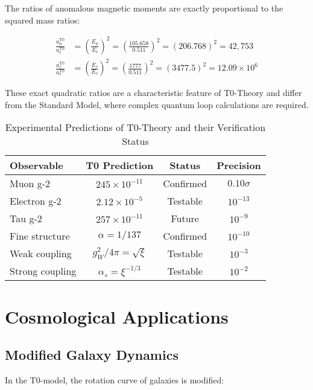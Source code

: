 \documentclass[12pt,a4paper]{article}
\newcommand{\ee}{\text{$\mathrm{e}$}}
\newcommand{\mmu}{\text{$\mu$}}
\newcommand{\ttau}{\text{$\tau$}}
\theoremstyle{definition}
\begin{document}
	\begin{verhaltnis}
		The ratios of anomalous magnetic moments are exactly proportional to the squared mass ratios:
		
		\begin{align}
			\frac{a_{\mmu}^{\text{T0}}}{a_{\ee}^{\text{T0}}} &= \left(\frac{E_{\mmu}}{E_{\ee}}\right)^2 = \left(\frac{105.658}{0.511}\right)^2 = (206.768)^2 = 42{,}753\\
			\frac{a_{\ttau}^{\text{T0}}}{a_{\ee}^{\text{T0}}} &= \left(\frac{E_{\ttau}}{E_{\ee}}\right)^2 = \left(\frac{1777}{0.511}\right)^2 = (3477.5)^2 = 12.09 \times 10^6
		\end{align}
		
		These exact quadratic ratios are a characteristic feature of T0-Theory and differ from the Standard Model, where complex quantum loop calculations are required.
	\end{verhaltnis}
	\begin{table}[h]
		\centering
		\begin{tabular}{lccc}
			\toprule
			\textbf{Observable} & \textbf{T0 Prediction} & \textbf{Status} & \textbf{Precision} \\
			\midrule
			Muon g-2 & $245 \times 10^{-11}$ & Confirmed & $0.10\sigma$ \\
			Electron g-2 & $2.12 \times 10^{-5}$ & Testable & $10^{-13}$ \\
			Tau g-2 & $257 \times 10^{-11}$ & Future & $10^{-9}$ \\
			Fine structure & $\alpha = 1/137$ & Confirmed & $10^{-10}$ \\
			Weak coupling & $g_W^2/4\pi = \sqrt{\xi}$ & Testable & $10^{-3}$ \\
			Strong coupling & $\alpha_s = \xi^{-1/3}$ & Testable & $10^{-2}$ \\
			\bottomrule
		\end{tabular}
		\caption{Experimental Predictions of T0-Theory and their Verification Status}
	\end{table}
	
	\section{Cosmological Applications}
	
	\subsection{Modified Galaxy Dynamics}
	
	In the T0-model, the rotation curve of galaxies is modified:
	
\end{document}
